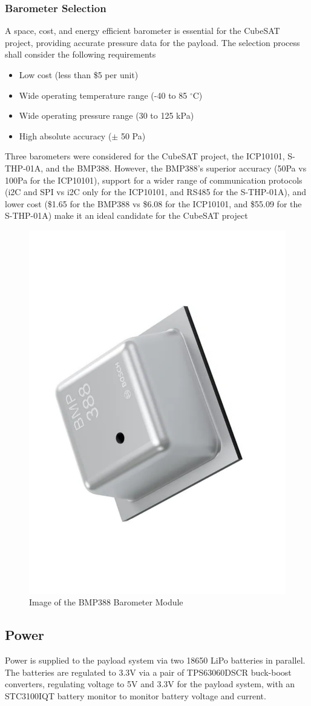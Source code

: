 \documentclass{report}
\begin{document}
                \subsubsection{Barometer Selection}
                    A space, cost, and energy efficient barometer is essential for the CubeSAT project,
                    providing accurate pressure data for the payload. The selection process shall consider
                    the following requirements
                    \begin{itemize}
                        \item Low cost (less than \$5 per unit)
                        \item Wide operating temperature range (-40 to 85 $^\circ$C)
                        \item Wide operating pressure range (30 to 125 kPa)
                        \item High absolute accuracy ($\pm$ 50 Pa)
                    \end{itemize}
                    Three barometers were considered for the CubeSAT project, the ICP10101, S-THP-01A, and
                    the BMP388. However, the BMP388's superior accuracy (50Pa vs 100Pa for the ICP10101),
                    support for a wider range of communication protocols (i2C and SPI vs i2C only for the ICP10101, and 
                    RS485 for the S-THP-01A), and lower cost (\$1.65 for the BMP388 vs \$6.08 for the ICP10101, and \$55.09 for the S-THP-01A)
                    make it an ideal candidate for the CubeSAT project \cite{bmpdatasheet}
                    \begin{figure}[H]
                        \centering
                        \includegraphics[width=0.2\linewidth, angle=235]{figures/BARO_IMG.pdf}
                        \caption{Image of the BMP388 Barometer Module}
                        \label{fig:baro_img}
                    \end{figure}
            \subsection{Power}
                Power is supplied to the payload system via two 18650 LiPo batteries in parallel.
                The batteries are regulated to 3.3V via a pair of TPS63060DSCR buck-boost converters, regulating
                voltage to 5V and 3.3V for the payload system, with an STC3100IQT battery monitor to monitor battery
                voltage and current.
\end{document}

